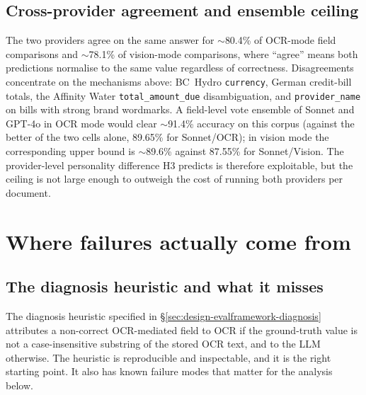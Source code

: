 \subsection{Cross-provider agreement and ensemble ceiling}
\label{sec:eval-rq3-agreement}

The two providers agree on the same answer for $\sim$80.4\% of OCR-mode
field comparisons and $\sim$78.1\% of vision-mode comparisons, where
``agree'' means both predictions normalise to the same value
regardless of correctness. Disagreements concentrate on the
mechanisms above: BC~Hydro \texttt{currency}, German credit-bill
totals, the Affinity Water \texttt{total\_amount\_due}
disambiguation, and \texttt{provider\_name} on bills with strong
brand wordmarks. A field-level vote ensemble of Sonnet and GPT-4o
in OCR mode would clear $\sim$91.4\% accuracy on this corpus
(against the better of the two cells alone, 89.65\% for Sonnet/OCR);
in vision mode the corresponding upper bound is $\sim$89.6\% against
87.55\% for Sonnet/Vision. The provider-level personality difference
H3 predicts is therefore exploitable, but the ceiling is not large
enough to outweigh the cost of running both providers per document.

\section{Where failures actually come from}
\label{sec:eval-failures}

\subsection{The diagnosis heuristic and what it misses}
\label{sec:eval-failures-heuristic}

The diagnosis heuristic specified in
\S\ref{sec:design-evalframework-diagnosis} attributes a non-correct
OCR-mediated field to OCR if the ground-truth value is not a
case-insensitive substring of the stored OCR text, and to the LLM
otherwise. The heuristic is reproducible and inspectable, and it is
the right starting point. It also has known failure modes that
matter for the analysis below.

